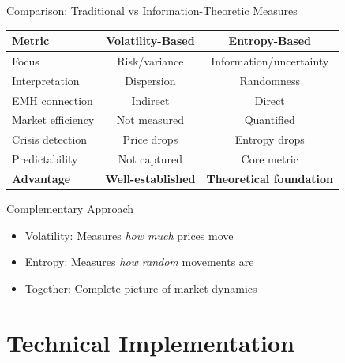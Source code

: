 \documentclass[aspectratio=169,12pt,xcolor=table]{beamer}
\begin{document}
\begin{frame}{Comparison: Traditional vs Information-Theoretic Measures}
\begin{table}[h]
\centering
\small
\begin{tabular}{lcc}
\toprule
\textbf{Metric} & \textbf{Volatility-Based} & \textbf{Entropy-Based} \\
\midrule
\rowcolor{lightgray}
Focus & Risk/variance & Information/uncertainty \\
Interpretation & Dispersion & Randomness \\
\rowcolor{lightgray}
EMH connection & Indirect & Direct \\
Market efficiency & Not measured & Quantified \\
\rowcolor{lightgray}
Crisis detection & Price drops & Entropy drops \\
Predictability & Not captured & Core metric \\
\rowcolor{lightgray}
\textbf{Advantage} & \textbf{Well-established} & \textbf{Theoretical foundation} \\
\bottomrule
\end{tabular}
\end{table}

\vspace{0.3cm}
\begin{block}{Complementary Approach}
\begin{itemize}
    \item Volatility: Measures \textit{how much} prices move
    \item Entropy: Measures \textit{how random} movements are
    \item Together: Complete picture of market dynamics
\end{itemize}
\end{block}
\end{frame}

\section{Technical Implementation}
\end{document}
